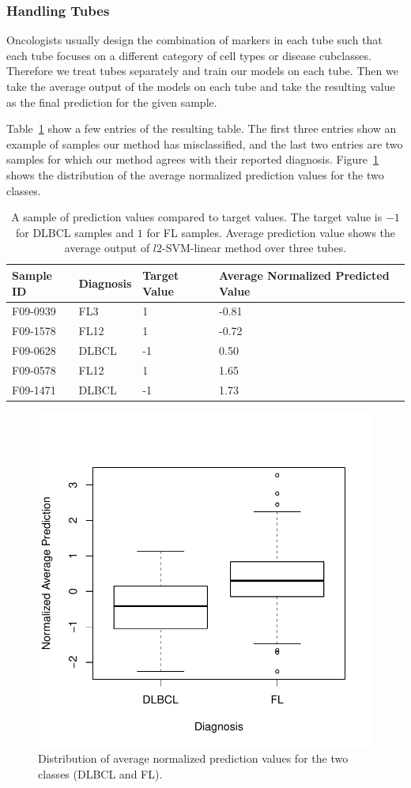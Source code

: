 \subsubsection{Handling Tubes}
Oncologists usually design the combination of markers in each tube such that each tube focuses on a different category of cell types or disease cubclasses. Therefore we treat tubes separately and train our models on each tube. Then we take the average output of the models on each tube and take the resulting value as the final prediction for the given sample.

Table~\ref{fig:fcs-qa-matchcount} show a few entries of the resulting table. The first three entries show an example of samples our method has misclassified, and the last two entries are two samples for which our method agrees with their reported diagnosis. Figure~\ref{fig:fcs-qa-predictions-boxplot} shows the distribution of the average normalized prediction values for the two classes.

\begin{table}[!ht]
  \centering
  \begin{tabular}{llll}
    Sample ID & Diagnosis & Target Value & Average Normalized Predicted Value \\ \hline
    F09-0939 & FL3 & 1 & -0.81 \\
    F09-1578 & FL12 & 1 & -0.72 \\
    F09-0628 & DLBCL & -1 & 0.50 \\
    F09-0578 & FL12 & 1 & 1.65 \\
    F09-1471 & DLBCL & -1 & 1.73
  \end{tabular}
  \caption{A sample of prediction values compared to target values. The target value is $-1$ for DLBCL samples and $1$ for FL samples. Average prediction value shows the average output of $l2$-SVM-linear method over three tubes.}
  \label{fig:fcs-qa-matchcount}
\end{table}

\begin{figure}[!ht]
  \centering
  \includegraphics[width=.6\textwidth]{figs/fcs-qa/predictions_boxplot}
  \caption{Distribution of average normalized prediction values for the two classes (DLBCL and FL).}
  \label{fig:fcs-qa-predictions-boxplot}
\end{figure}


